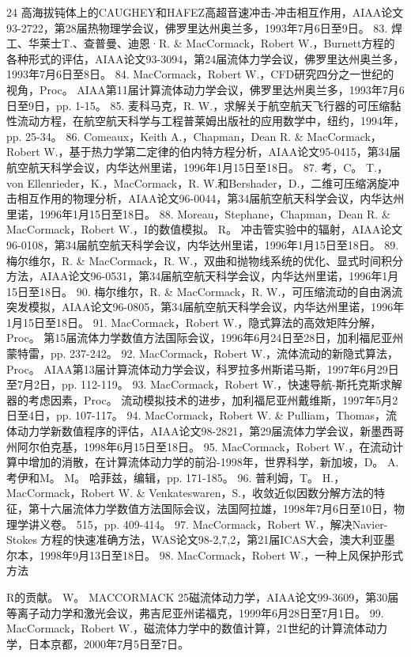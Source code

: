 \documentclass[UTF8,11pt,a4paper,openany,fontset=fandol]{ctexbook}
\begin{document}
24 高海拔钝体上的CAUGHEY和HAFEZ高超音速冲击-冲击相互作用，AIAA论文93-2722，第28届热物理学会议，佛罗里达州奥兰多，1993年7月6日至9日。 83. 焊工、华莱士T.、查普曼、迪恩·R. \& MacCormack，Robert W.，Burnett方程的各种形式的评估，AIAA论文93-3094，第24届流体力学会议，佛罗里达州奥兰多，1993年7月6日至8日。 84. MacCormack，Robert W.，CFD研究四分之一世纪的视角，Proc。 AIAA第11届计算流体动力学会议，佛罗里达州奥兰多，1993年7月6日至9日，pp. 1-15。 85. 麦科马克，R. W.，求解关于航空航天飞行器的可压缩黏性流动方程，在航空航天科学与工程普莱姆出版社的应用数学中，纽约，1994年，pp. 25-34。 86. Comeaux，Keith A.，Chapman，Dean R. \& MacCormack，Robert W.，基于热力学第二定律的伯内特方程分析，AIAA论文95-0415，第34届航空航天科学会议，内华达州里诺，1996年1月15日至18日。 87. 考，C。 T.，von Ellenrieder，K.，MacCormack，R. W.和Bershader，D.，二维可压缩涡旋冲击相互作用的物理分析，AIAA论文96-0044，第34届航空航天科学会议，内华达州里诺，1996年1月15日至18日。 88. Moreau，Stephane，Chapman，Dean R. \& MacCormack，Robert W.，I的数值模拟。 R。 冲击管实验中的辐射，AIAA论文96-0108，第34届航空航天科学会议，内华达州里诺，1996年1月15日至18日。 89. 梅尔维尔，R. \& MacCormack，R. W.，双曲和抛物线系统的优化、显式时间积分方法，AIAA论文96-0531，第34届航空航天科学会议，内华达州里诺，1996年1月15日至18日。 90. 梅尔维尔，R. \& MacCormack，R. W.，可压缩流动的自由涡流突发模拟，AIAA论文96-0805，第34届航空航天科学会议，内华达州里诺，1996年1月15日至18日。 91. MacCormack，Robert W.，隐式算法的高效矩阵分解，Proc。 第15届流体力学数值方法国际会议，1996年6月24日至28日，加利福尼亚州蒙特雷，pp. 237-242。 92. MacCormack，Robert W.，流体流动的新隐式算法，Proc。 AIAA第13届计算流体动力学会议，科罗拉多州斯诺马斯，1997年6月29日至7月2日，pp. 112-119。 93. MacCormack，Robert W.，快速导航-斯托克斯求解器的考虑因素，Proc。 流动模拟技术的进步，加利福尼亚州戴维斯，1997年5月2日至4日，pp. 107-117。 94. MacCormack，Robert W. \& Pulliam，Thomas，流体动力学新数值程序的评估，AIAA论文98-2821，第29届流体力学会议，新墨西哥州阿尔伯克基，1998年6月15日至18日。 95. MacCormack，Robert W.，在流动计算中增加的消散，在计算流体动力学的前沿-1998年，世界科学，新加坡，D。 A. 考伊和M。 M。 哈菲兹，编辑，pp. 171-185。 96. 普利姆，T。 H.，MacCormack，Robert W. \& Venkateswaren，S.，收敛近似因数分解方法的特征，第十六届流体力学数值方法国际会议，法国阿拉雄，1998年7月6日至10日，物理学讲义卷。 515，pp. 409-414。 97. MacCormack，Robert W.，解决Navier-Stokes 方程的快速准确方法，WAS论文98-2,7,2，第21届ICAS大会，澳大利亚墨尔本，1998年9月13日至18日。 98. MacCormack，Robert W.，一种上风保护形式方法

R的贡献。 W。 MACCORMACK 25磁流体动力学，AIAA论文99-3609，第30届等离子动力学和激光会议，弗吉尼亚州诺福克，1999年6月28日至7月1日。 99. MacCormack，Robert W.，磁流体力学中的数值计算，21世纪的计算流体动力学，日本京都，2000年7月5日至7日。
\end{document}
